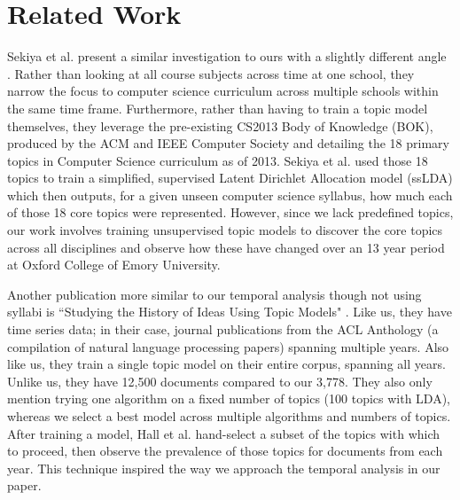 \documentclass[fleqn,10pt]{JLA_article} %
\begin{document}



\section{Related Work}

Sekiya et al. present a similar investigation to ours with a slightly different angle \cite{8190598}. Rather than looking at all course subjects across time at one school, they narrow the focus to computer science curriculum across multiple schools within the same time frame. Furthermore, rather than having to train a topic model themselves, they leverage the pre-existing CS2013 Body of Knowledge (BOK), produced by the ACM and IEEE Computer Society and detailing the 18 primary topics in Computer Science curriculum as of 2013. Sekiya et al. used those 18 topics to train a simplified, supervised Latent Dirichlet Allocation model (ssLDA) which then outputs, for a given unseen computer science syllabus, how much each of those 18 core topics were represented. However, since we lack predefined topics, our work involves training unsupervised topic models to discover the core topics across all disciplines and observe how these have changed over an 13 year period at Oxford College of Emory University. 

Another publication more similar to our temporal analysis though not using syllabi is ``Studying the History of Ideas Using Topic Models" \cite{hall08}. Like us, they have time series data; in their case, journal publications from the ACL Anthology (a compilation of natural language processing papers) spanning multiple years. Also like us, they train a single topic model on their entire corpus, spanning all years. Unlike us, they have 12,500 documents compared to our 3,778. They also only mention trying one algorithm on a fixed number of topics (100 topics with LDA), whereas we select a best model across multiple algorithms and numbers of topics. After training a model, Hall et al. hand-select a subset of the topics with which to proceed, then observe the prevalence of those topics for documents from each year. This technique inspired the way we approach the temporal analysis in our paper. 
\end{document}
